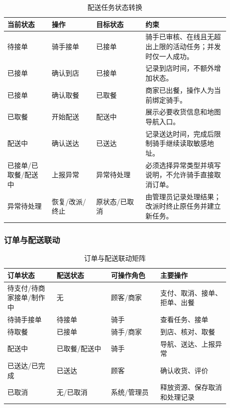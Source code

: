 \begin{longtable}{|L{0.18\linewidth}|L{0.18\linewidth}|L{0.20\linewidth}|L{0.34\linewidth}|}
\caption{配送任务状态转换}\label{tab:delivery-state}\\ \hline
\textbf{当前状态} & \textbf{操作} & \textbf{目标状态} & \textbf{约束} \\ \hline
待接单 & 骑手接单 & 已接单 & 骑手已审核、在线且无超出上限的活动任务；并发时仅一人成功。 \\ \hline
已接单 & 确认到店 & 已接单 & 记录到店时间，不额外增加状态。 \\ \hline
已接单 & 确认取餐 & 已取餐 & 商家已出餐，操作人为当前绑定骑手。 \\ \hline
已取餐 & 开始配送 & 配送中 & 展示必要收货信息和地图导航入口。 \\ \hline
配送中 & 确认送达 & 已送达 & 记录送达时间，完成后限制骑手继续读取敏感地址。 \\ \hline
已接单/已取餐/配送中 & 上报异常 & 异常待处理 & 必须选择异常类型并填写说明，不允许骑手直接取消订单。 \\ \hline
异常待处理 & 恢复/改派/终止 & 原状态/已取消 & 由管理员记录处理结果；改派时终止原任务并建立新任务。 \\ \hline
\end{longtable}

\subsubsection{订单与配送联动}

\begin{longtable}{|L{0.20\linewidth}|L{0.22\linewidth}|L{0.20\linewidth}|L{0.28\linewidth}|}
\caption{订单与配送联动矩阵}\label{tab:order-delivery-map}\\ \hline
\textbf{订单状态} & \textbf{配送状态} & \textbf{可操作角色} & \textbf{主要操作} \\ \hline
待支付/待商家接单/制作中 & 无 & 顾客/商家 & 支付、取消、接单、拒单、出餐 \\ \hline
待骑手接单 & 待接单 & 骑手 & 查看任务、接单 \\ \hline
待取餐 & 已接单 & 骑手/商家 & 到店、核对、取餐 \\ \hline
配送中 & 已取餐/配送中 & 骑手 & 导航、送达、上报异常 \\ \hline
已送达/已完成 & 已送达 & 顾客 & 确认收货、评价 \\ \hline
已取消 & 无/已取消 & 系统/管理员 & 释放资源、保存取消和处理记录 \\ \hline
\end{longtable}

